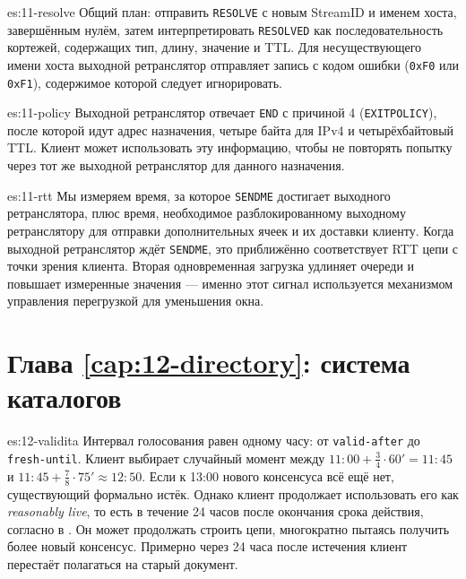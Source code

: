 \begin{soluzione}{es:11-resolve}
Общий план: отправить \texttt{RESOLVE} с новым StreamID и именем хоста, завершённым нулём, затем интерпретировать \texttt{RESOLVED} как последовательность кортежей, содержащих тип, длину, значение и TTL. Для несуществующего имени хоста выходной ретранслятор отправляет запись с кодом ошибки (\texttt{0xF0} или \texttt{0xF1}), содержимое которой следует игнорировать.
\end{soluzione}

\begin{soluzione}{es:11-policy}
Выходной ретранслятор отвечает \texttt{END} с причиной 4 (\texttt{EXITPOLICY}), после которой идут адрес назначения, четыре байта для IPv4 и четырёхбайтовый TTL. Клиент может использовать эту информацию, чтобы не повторять попытку через тот же выходной ретранслятор для данного назначения.
\end{soluzione}

\begin{soluzione}{es:11-rtt}
Мы измеряем время, за которое \texttt{SENDME} достигает выходного ретранслятора, плюс время, необходимое разблокированному выходному ретранслятору для отправки дополнительных ячеек и их доставки клиенту. Когда выходной ретранслятор ждёт \texttt{SENDME}, это приближённо соответствует RTT цепи с точки зрения клиента. Вторая одновременная загрузка удлиняет очереди и повышает измеренные значения — именно этот сигнал используется механизмом управления перегрузкой для уменьшения окна.
\end{soluzione}

\section*{Глава \ref{cap:12-directory}: система каталогов}

\begin{soluzione}{es:12-validita}
Интервал голосования равен одному часу: от \texttt{valid-after} до \texttt{fresh-until}. Клиент выбирает случайный момент между $11{:}00 + \tfrac34 \cdot 60' = 11{:}45$ и $11{:}45 + \tfrac78 \cdot 75' \approx 12{:}50$. Если к 13:00 нового консенсуса всё ещё нет, существующий формально истёк. Однако клиент продолжает использовать его как \emph{reasonably live}, то есть в течение 24 часов после окончания срока действия, согласно  в . Он может продолжать строить цепи, многократно пытаясь получить более новый консенсус. Примерно через 24 часа после истечения клиент перестаёт полагаться на старый документ.
\end{soluzione}

